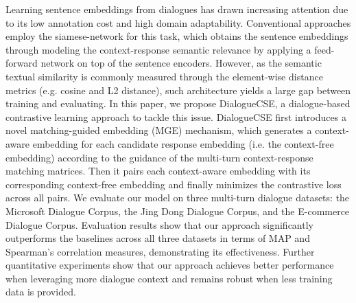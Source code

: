 Learning sentence embeddings from dialogues has drawn increasing attention due to its low annotation cost and high domain adaptability. Conventional approaches employ the siamese-network for this task, which obtains the sentence embeddings through modeling the context-response semantic relevance by applying a feed-forward network on top of the sentence encoders. However, as the semantic textual similarity is commonly measured through the element-wise distance metrics (e.g. cosine and L2 distance), such architecture yields a large gap between training and evaluating. In this paper, we propose DialogueCSE, a dialogue-based contrastive learning approach to tackle this issue. DialogueCSE first introduces a novel matching-guided embedding (MGE) mechanism, which generates a context-aware embedding for each candidate response embedding (i.e. the context-free embedding) according to the guidance of the multi-turn context-response matching matrices. Then it pairs each context-aware embedding with its corresponding context-free embedding and finally minimizes the contrastive loss across all pairs. We evaluate our model on three multi-turn dialogue datasets: the Microsoft Dialogue Corpus, the Jing Dong Dialogue Corpus, and the E-commerce Dialogue Corpus. Evaluation results show that our approach significantly outperforms the baselines across all three datasets in terms of MAP and Spearman's correlation measures, demonstrating its effectiveness. Further quantitative experiments show that our approach achieves better performance when leveraging more dialogue context and remains robust when less training data is provided.

